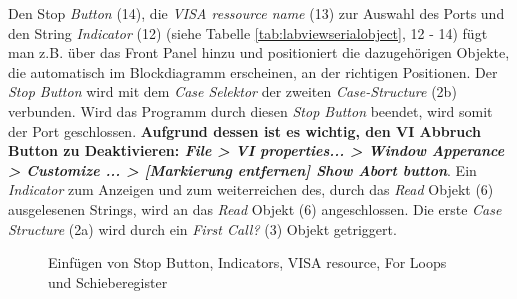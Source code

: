 \noindent Den Stop \textit{Button} (14), die \textit{VISA ressource name} (13) zur Auswahl des Ports und den String \textit{Indicator} (12) (siehe Tabelle \ref{tab:labviewserialobject}, 12 - 14) fügt man z.B. über das Front Panel hinzu und positioniert die dazugehörigen Objekte, die automatisch im Blockdiagramm erscheinen, an der richtigen Positionen. Der \textit{Stop Button} wird mit dem \textit{Case Selektor} der zweiten \textit{Case-Structure} (2b) verbunden. Wird das Programm durch diesen \textit{Stop Button} beendet, wird somit der Port geschlossen. \textbf{Aufgrund dessen ist es wichtig, den VI Abbruch Button zu Deaktivieren: \emph{File > VI properties... > Window Apperance > Customize ... > [Markierung entfernen] Show Abort button}}. Ein \textit{Indicator} zum Anzeigen und zum weiterreichen des, durch das \textit{Read} Objekt (6) ausgelesenen Strings, wird an das \textit{Read} Objekt (6) angeschlossen. Die erste \textit{Case Structure} (2a) wird durch ein \textit{First Call?} (3) Objekt getriggert.\\

\begin{figure}[hp!]
\vspace{5pt}
\ContinuedFloat
{} 
\caption[]{Einfügen von Stop Button, Indicators, VISA resource, For Loops und Schieberegister}
\label{fig:step2_step3}
\end{figure}


